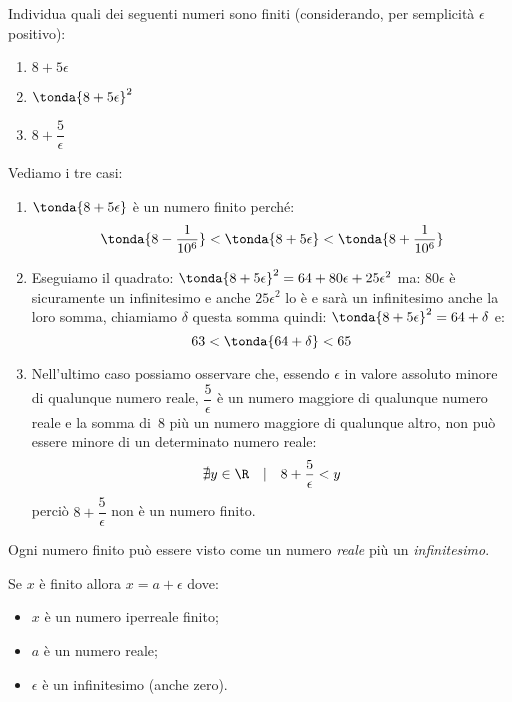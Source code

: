 \begin{esempio}
 Individua quali dei seguenti numeri sono finiti (considerando, per 
semplicità \(\epsilon\) positivo):

\begin{multicols}{3}
\begin{enumerate}
 \item \(8+5\epsilon\)
 \item \(\tonda{8+5\epsilon}^2\)
 \item \(8+\dfrac{5}{\epsilon}\)
\end{enumerate}
\end{multicols}

Vediamo i tre casi:

\begin{enumerate}
 \item \(\tonda{8+5\epsilon}\) è un numero finito perché:
 \[\tonda{8-\dfrac{1}{10^6}} < \tonda{8+5\epsilon} < 
   \tonda{8+\dfrac{1}{10^6}}\]
 \item Eseguiamo il quadrato:
 \(\tonda{8+5\epsilon}^2 = 64 +80 \epsilon +25 \epsilon^2\)
 ma: \(80 \epsilon\) è sicuramente un infinitesimo e anche \(25 \epsilon^2\)
 lo è e sarà un infinitesimo anche la loro somma, chiamiamo \(\delta\) 
questa somma quindi: 
\(\tonda{8+5\epsilon}^2 = 64 + \delta\)
e: 
\[63 < \tonda{64 + \delta} < 65\]
 \item Nell'ultimo caso possiamo osservare che, essendo \(\epsilon\) in 
valore assoluto minore di qualunque numero reale, 
 \(\dfrac{5}{\epsilon}\) è un numero maggiore di qualunque numero reale e 
la somma di~8 più un numero maggiore di qualunque altro, non può essere 
minore di un determinato numero reale:
 \[\nexists y \in \R \quad | \quad 8+\dfrac{5}{\epsilon} < y\]
perciò \(8+\dfrac{5}{\epsilon}\) non è un numero finito.
\end{enumerate}
\end{esempio}

\newpage %

\noindent Ogni numero finito può essere visto come un numero \emph{reale} 
più un \emph{infinitesimo}.

Se \(x\) è finito allora \(x = a + \epsilon\) dove:
\begin{itemize} [noitemsep]
 \item \(x\) è un numero iperreale finito;
 \item \(a\) è un numero reale;
 \item \(\epsilon\) è un infinitesimo (anche zero).
\end{itemize}

